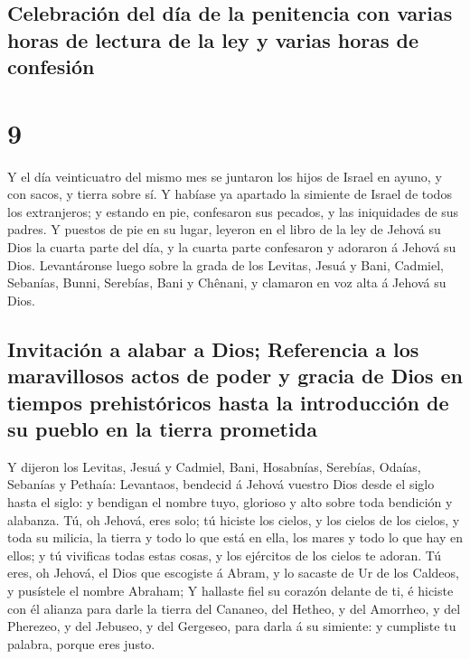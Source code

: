 \hypertarget{celebraciuxf3n-del-duxeda-de-la-penitencia-con-varias-horas-de-lectura-de-la-ley-y-varias-horas-de-confesiuxf3n}{%
\subsection{Celebración del día de la penitencia con varias horas de
lectura de la ley y varias horas de
confesión}\label{celebraciuxf3n-del-duxeda-de-la-penitencia-con-varias-horas-de-lectura-de-la-ley-y-varias-horas-de-confesiuxf3n}}

\hypertarget{section-8}{%
\section{9}\label{section-8}}

 Y el día veinticuatro del mismo mes se juntaron los hijos
de Israel en ayuno, y con sacos, y tierra sobre sí.  Y
habíase ya apartado la simiente de Israel de todos los extranjeros; y
estando en pie, confesaron sus pecados, y las iniquidades de sus padres.
 Y puestos de pie en su lugar, leyeron en el libro de la ley
de Jehová su Dios la cuarta parte del día, y la cuarta parte confesaron
y adoraron á Jehová su Dios.  Levantáronse luego sobre la
grada de los Levitas, Jesuá y Bani, Cadmiel, Sebanías, Bunni, Serebías,
Bani y Chênani, y clamaron en voz alta á Jehová su Dios.

\hypertarget{invitaciuxf3n-a-alabar-a-dios-referencia-a-los-maravillosos-actos-de-poder-y-gracia-de-dios-en-tiempos-prehistuxf3ricos-hasta-la-introducciuxf3n-de-su-pueblo-en-la-tierra-prometida}{%
\subsection{Invitación a alabar a Dios; Referencia a los maravillosos
actos de poder y gracia de Dios en tiempos prehistóricos hasta la
introducción de su pueblo en la tierra
prometida}\label{invitaciuxf3n-a-alabar-a-dios-referencia-a-los-maravillosos-actos-de-poder-y-gracia-de-dios-en-tiempos-prehistuxf3ricos-hasta-la-introducciuxf3n-de-su-pueblo-en-la-tierra-prometida}}

 Y dijeron los Levitas, Jesuá y Cadmiel, Bani, Hosabnías,
Serebías, Odaías, Sebanías y Pethaía: Levantaos, bendecid á Jehová
vuestro Dios desde el siglo hasta el siglo: y bendigan el nombre tuyo,
glorioso y alto sobre toda bendición y alabanza.  Tú, oh
Jehová, eres solo; tú hiciste los cielos, y los cielos de los cielos, y
toda su milicia, la tierra y todo lo que está en ella, los mares y todo
lo que hay en ellos; y tú vivificas todas estas cosas, y los ejércitos
de los cielos te adoran.  Tú eres, oh Jehová, el Dios que
escogiste á Abram, y lo sacaste de Ur de los Caldeos, y pusístele el
nombre Abraham;  Y hallaste fiel su corazón delante de ti, é
hiciste con él alianza para darle la tierra del Cananeo, del Hetheo, y
del Amorrheo, y del Pherezeo, y del Jebuseo, y del Gergeseo, para darla
á su simiente: y cumpliste tu palabra, porque eres justo.

